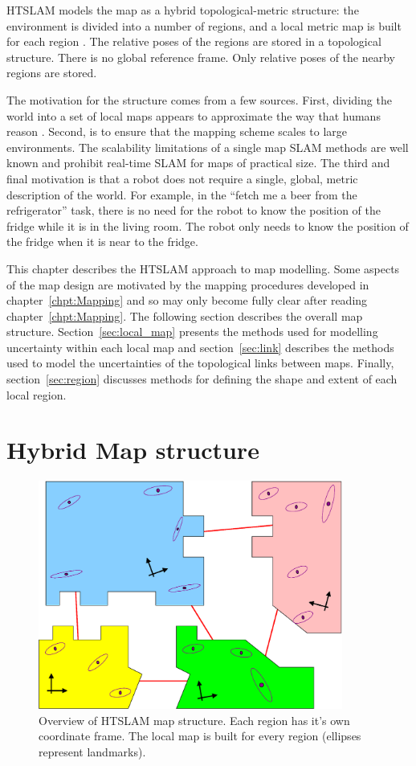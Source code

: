 HTSLAM models the map as a hybrid topological-metric structure: the
environment is divided into a number of regions, and a local metric
map is built for each region . The relative poses of the regions are
stored in a topological structure. There is no global reference
frame. Only relative poses of the nearby regions are stored.

The motivation for the structure comes from a few sources. First,
dividing the world into a set of local maps appears to approximate the
way that humans reason \cite{psycho_kuipers82}. Second, is to ensure
that the mapping scheme scales to large environments.  The scalability
limitations of a single map SLAM methods are well known
\cite{guivant03,guivant01,guivant02} and prohibit real-time SLAM for
maps of practical size.  The third and final motivation is that a
robot does not require a single, global, metric description of the
world.  For example, in the ``fetch me a beer from the refrigerator''
task, there is no need for the robot to know the position of the
fridge while it is in the living room.  The robot only needs to know
the position of the fridge when it is near to the fridge.

This chapter describes the HTSLAM approach to map modelling.  Some
aspects of the map design are motivated by the mapping procedures
developed in chapter~\ref{chpt:Mapping} and so may only become fully
clear after reading chapter~\ref{chpt:Mapping}. The following section
describes the overall map structure.  Section~\ref{sec:local_map}
presents the methods used for modelling uncertainty within each local
map and section~\ref{sec:link} describes the methods used to model the
uncertainties of the topological links between maps.  Finally,
section~\ref{sec:region} discusses methods for defining the shape and
extent of each local region.

\section{Hybrid Map structure}
\label{sec:HM_structure}

\begin{figure}
\begin{center}
\includegraphics[width=10cm]{Pics/fig_map_structure}
\end{center}
\caption{Overview of HTSLAM map structure. Each region has it's own
coordinate frame. The local map is built for every region (ellipses
represent landmarks). }
\label{fig:htslam_structure}
\end{figure}

